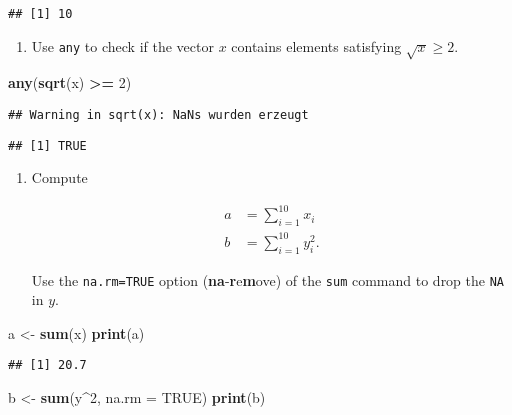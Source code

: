\documentclass[]{article}
\newenvironment{Shaded}{\begin{snugshade}}{\end{snugshade}}
\newcommand{\KeywordTok}[1]{\textcolor[rgb]{0.13,0.29,0.53}{\textbf{#1}}}
\newcommand{\DataTypeTok}[1]{\textcolor[rgb]{0.13,0.29,0.53}{#1}}
\newcommand{\DecValTok}[1]{\textcolor[rgb]{0.00,0.00,0.81}{#1}}
\newcommand{\StringTok}[1]{\textcolor[rgb]{0.31,0.60,0.02}{#1}}
\newcommand{\OtherTok}[1]{\textcolor[rgb]{0.56,0.35,0.01}{#1}}
\newcommand{\OperatorTok}[1]{\textcolor[rgb]{0.81,0.36,0.00}{\textbf{#1}}}
\newcommand{\NormalTok}[1]{#1}
\providecommand{\tightlist}{%
  \setlength{\itemsep}{0pt}\setlength{\parskip}{0pt}}
\begin{document}
\begin{verbatim}
## [1] 10
\end{verbatim}

\begin{enumerate}
\def\labelenumi{\arabic{enumi}.}
\setcounter{enumi}{2}
\tightlist
\item
  Use \texttt{any} to check if the vector \(x\) contains elements
  satisfying \(\sqrt{x}\geq 2\).
\end{enumerate}

\begin{Shaded}
\begin{Highlighting}[]
\KeywordTok{any}\NormalTok{(}\KeywordTok{sqrt}\NormalTok{(x) }\OperatorTok{>=}\StringTok{ }\DecValTok{2}\NormalTok{)}
\end{Highlighting}
\end{Shaded}

\begin{verbatim}
## Warning in sqrt(x): NaNs wurden erzeugt
\end{verbatim}

\begin{verbatim}
## [1] TRUE
\end{verbatim}

\begin{enumerate}
\def\labelenumi{\arabic{enumi}.}
\setcounter{enumi}{3}
\tightlist
\item
  Compute

  \begin{align*}
  a &=\sum_{i=1}^{10}x_{i} \\
  b &=\sum_{i=1}^{10}y_{i}^{2}.
  \end{align*}

  Use the \texttt{na.rm=TRUE} option
  (\textbf{na}-\textbf{r}e\textbf{m}ove) of the \texttt{sum} command to
  drop the \texttt{NA} in \(y\).
\end{enumerate}

\begin{Shaded}
\begin{Highlighting}[]
\NormalTok{a <-}\StringTok{ }\KeywordTok{sum}\NormalTok{(x)}
\KeywordTok{print}\NormalTok{(a)}
\end{Highlighting}
\end{Shaded}

\begin{verbatim}
## [1] 20.7
\end{verbatim}

\begin{Shaded}
\begin{Highlighting}[]
\NormalTok{b <-}\StringTok{ }\KeywordTok{sum}\NormalTok{(y}\OperatorTok{^}\DecValTok{2}\NormalTok{, }\DataTypeTok{na.rm =} \OtherTok{TRUE}\NormalTok{)}
\KeywordTok{print}\NormalTok{(b)}
\end{Highlighting}
\end{Shaded}
\end{document}
